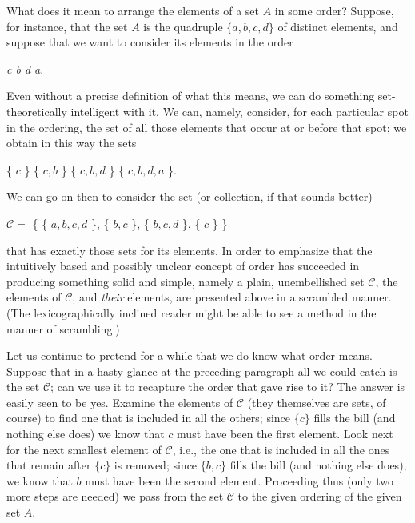 

What does it mean to arrange the elements of a set $A$ in some order? Suppose, for instance, that the set $A$ is the quadruple $ \{a, b, c, d \} $ of distinct elements, and suppose that we want to consider its elements in the order 

\begin{center}
\textit{c b d a}.
\end{center}

Even without a precise definition of what this means, we can do something set-theoretically intelligent with it. We can, namely, consider, for each particular spot in the ordering, the set of all those elements that occur at or before that spot; we obtain in this way the sets 

\begin{center}
 \{ $c$ \}  \{ $c, b$ \} \{ $c, b, d$ \} \{ $c, b, d, a$ \}. 
\end{center}

We can go on then to consider the set (or collection, if that sounds better) 

\begin{center}
$\mathcal{C} = $ \{ \{ $a, b, c, d$ \}, \{ $b, c$ \}, \{ $b, c, d$ \}, \{ $c$ \} \} 
\end{center}

that has exactly those sets for its elements. In order to emphasize that the intuitively based and possibly unclear concept of order has succeeded in producing something solid and simple, namely a plain,  unembellished set $ \mathcal{C} $, the elements of $ \mathcal{C} $, and \textit{their} elements, are presented above in a scrambled manner. (The lexicographically inclined reader might be able to see a method in the manner of scrambling.) 

Let us continue to pretend for a while that we do know what order means. Suppose that in a hasty glance at the preceding paragraph all we could catch is the set $\mathcal{C}$; can we use it to recapture the order that gave rise to it? The answer is easily seen to be yes. Examine the elements of $ \mathcal{C} $ (they themselves are sets, of course) to find one that is included in all the others; since $ \{c \}$ fills the bill (and nothing else does) we know that $c$ must have been the first element. Look next for the next smallest element of $ \mathcal{C}$, i.e., the one that is included in all the ones that remain after $ \{ c \} $ is removed; since $ \{ b, c \} $ fills the bill (and nothing else does), we know that $b$ must have been the second element. Proceeding thus (only two more steps are needed) we pass from the set $ \mathcal{C} $ to the given ordering of the given set $A$. 

